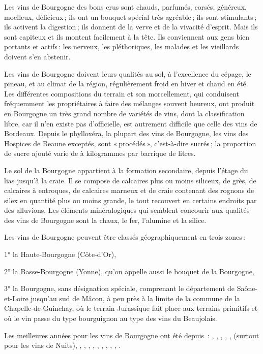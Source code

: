 Les vins de Bourgogne des bons crus sont chauds, parfumés, corsés, généreux,
moelleux, délicieux ; ils ont un bouquet spécial très agréable ; ils sont
stimulants ; ils activent la digestion ; ils donnent de la verve et de la
vivacité d'esprit. Mais ils sont capiteux et ils montent facilement à la tête.
Ils conviennent aux gens bien portants et actifs : les nerveux, les
pléthoriques, les malades et les vieillards doivent s'en abstenir.

Les vins de Bourgogne doivent leurs qualités au sol, à l'excellence du cépage,
le pineau, et au climat de la région, régulièrement froid en hiver et chaud en
été. Les différentes compositions du terrain et son morcellement, qui
conduisent fréquemment les propriétaires à faire des mélanges souvent heureux,
ont produit en Bourgogne un très grand nombre de variétés de vins, dont la
classification libre, car il n’en existe pas d'officielle, est autrement
difficile que celle des vins de Bordeaux. Depuis le phylloxéra, la plupart des
vins de Bourgogne, les vins des Hospices de Beaune exceptés, sont « procédés »,
c'est-à-dire sucrés ; la proportion de sucre ajouté varie de {\mmm}
à {\mmm} kilogrammes par barrique de {\mmm} litres.

Le sol de la Bourgogne appartient à la formation secondaire, depuis l'étage du
lias jusqu'à la craie. Il se compose de calcaires plus ou moins siliceux, de
grès, de calcaires à entroques, de calcaires marneux et de craie contenant des
rognons de silex en quantité plus ou moins grande, le tout recouvert en
certains endroits par des alluvions. Les éléments minéralogiques qui semblent
concourir aux qualités des vins de Bourgogne sont la chaux, le fer, l'alumine
et la silice.

Les vins de Bourgogne peuvent être classés géographiquement en trois zones :

1° la Haute-Bourgogne (Côte-d'Or),

2° la Basse-Bourgogne (Yonne), qu'on appelle aussi le bouquet de la Bourgogne,

3° la Bourgogne, sans désignation spéciale, comprenant le département de
Saône-et-Loire jusqu'au sud de Mâcon, à peu près à la limite de la commune de
la Chapelle-de-Guinchay, où le terrain Jurassique fait place aux terrains
primitifs et où le vin passe du type bourguignon au type des vins du
Beaujolais.

Les meilleures années pour les vins de Bourgogne ont été depuis
{\mmm} : {\mmm}, {\mmm}, {\mmm},
{\mmm}, {\mmm}, {\mmm} (surtout pour les vins de
Nuits), {\mmm}, {\mmm}, {\mmm}, {\mmm},
{\mmm}, {\mmm}, {\mmm}, {\mmm}, {\mmm},
{\mmm}.

